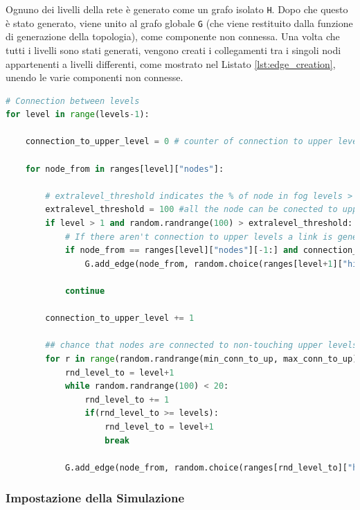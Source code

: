 Ognuno dei livelli della rete è generato come un grafo isolato \texttt{H}. Dopo che questo è stato generato, viene unito al grafo globale \texttt{G} (che viene restituito dalla funzione di generazione della topologia), come componente non connessa. Una volta che tutti i livelli sono stati generati, vengono creati i collegamenti tra i singoli nodi appartenenti a livelli differenti, come mostrato nel Listato \ref{lst:edge_creation}, unendo le varie componenti non connesse.

\begin{lstlisting}[language=python, label={lst:edge_creation}, caption={Generazione dei collegamenti tra i nodi appartenenti a livelli diversi.}, captionpos=b]
# Connection between levels
for level in range(levels-1):
    
    connection_to_upper_level = 0 # counter of connection to upper levels

    for node_from in ranges[level]["nodes"]:

        # extralevel_threshold indicates the % of node in fog levels > 1 that are connected to upper levels
        extralevel_threshold = 100 #all the node can be conected to upper level
        if level > 1 and random.randrange(100) > extralevel_threshold:
            # If there aren't connection to upper levels a link is generated
            if node_from == ranges[level]["nodes"][-1:] and connection_to_upper_level == 0:
                G.add_edge(node_from, random.choice(ranges[level+1]["highest_degrees"]))
            
            continue

        connection_to_upper_level += 1
    
        ## chance that nodes are connected to non-touching upper levels
        for r in range(random.randrange(min_conn_to_up, max_conn_to_up)):
            rnd_level_to = level+1
            while random.randrange(100) < 20:
                rnd_level_to += 1
                if(rnd_level_to >= levels):
                    rnd_level_to = level+1
                    break
        
            G.add_edge(node_from, random.choice(ranges[rnd_level_to]["highest_degrees" if level > 0 else "nodes"])) 
\end{lstlisting}

\subsubsection{Impostazione della Simulazione}

